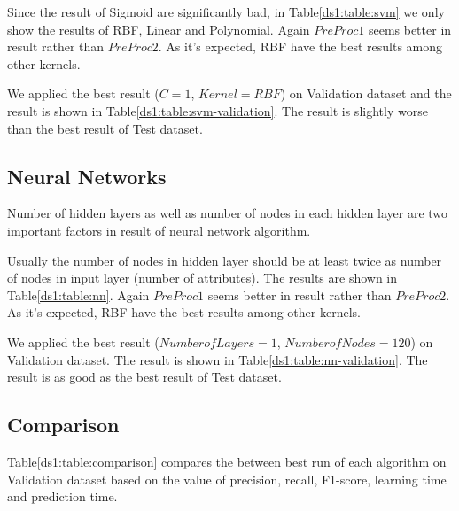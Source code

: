 Since the result of Sigmoid are significantly bad, in Table\ref{ds1:table:svm} we only show the results of RBF, Linear and Polynomial. Again $PreProc1$ seems better in result rather than $PreProc2$. As it's expected, RBF have the best results among other kernels.

We applied the best result ($C=1$, $Kernel=RBF$) on Validation dataset and the result is shown in Table\ref{ds1:table:svm-validation}. The result is slightly worse than the best result of Test dataset.

\subsection{Neural Networks}
Number of hidden layers as well as number of nodes in each hidden layer are two important factors in result of neural network algorithm. 

Usually the number of nodes in hidden layer should be at least twice as number of nodes in input layer (number of attributes). The results are shown in Table\ref{ds1:table:nn}. Again $PreProc1$ seems better in result rather than $PreProc2$. As it's expected, RBF have the best results among other kernels.

We applied the best result ($Number of Layers=1$, $Number of Nodes=120$) on Validation dataset. The result is shown in Table\ref{ds1:table:nn-validation}. The result is as good as the best result of Test dataset.

\subsection{Comparison}
Table\ref{ds1:table:comparison} compares the between best run of each algorithm on Validation dataset based on the value of precision, recall, F1-score, learning time and prediction time.

